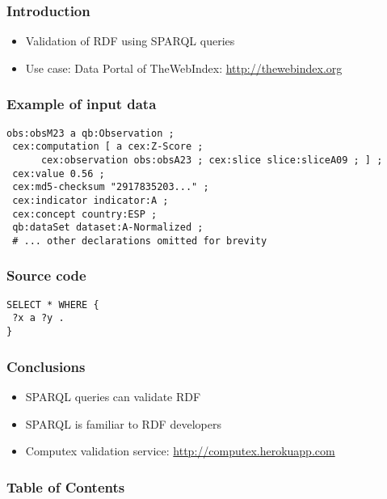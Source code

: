\frame{\titlepage}

\begin{frame}
\frametitle{Introduction}
\begin{itemize}
\item Validation of RDF using SPARQL queries
\item Use case: Data Portal of TheWebIndex: \url{http://thewebindex.org}
\end{itemize}
\end{frame}

\begin{frame}[fragile]\frametitle{Example of input data}

\begin{lstlisting}[style=SPARQL]
obs:obsM23 a qb:Observation ;
 cex:computation [ a cex:Z-Score ; 
      cex:observation obs:obsA23 ; cex:slice slice:sliceA09 ; ] ;
 cex:value 0.56 ;
 cex:md5-checksum "2917835203..." ;
 cex:indicator indicator:A ;
 cex:concept country:ESP ;
 qb:dataSet dataset:A-Normalized ;
 # ... other declarations omitted for brevity
\end{lstlisting}

\end{frame}

\begin{frame}[fragile]
\frametitle{Source code}
 
\begin{lstlisting}[style=SPARQL,caption=SPARQL query]
SELECT * WHERE {
 ?x a ?y .
}
\end{lstlisting}

\end{frame}

\begin{frame}
\frametitle{Conclusions}
\begin{itemize}
\item SPARQL queries can validate RDF
\item SPARQL is familiar to RDF developers
\item Computex validation service: \url{http://computex.herokuapp.com}
\end{itemize}
\end{frame}
 
\begin{frame}
\frametitle{Table of Contents}
\tableofcontents
\end{frame}